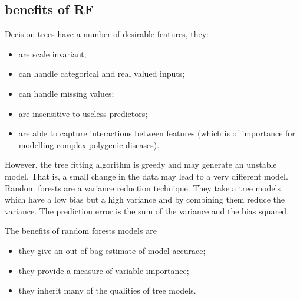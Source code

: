 \documentclass[10pt,letterpaper]{article}
\begin{document}
\subsection*{benefits of RF}  



Decision trees have a number of desirable features, they:
\begin{itemize}
  \item are scale invariant;
  \item can handle categorical and real valued inputs;
  \item can handle missing values;
  \item are insensitive to useless predictors;
  \item are able to capture interactions between features (which is of importance for modelling complex polygenic diseases).
  \end{itemize}
However, the tree fitting algorithm is greedy and may generate an unstable model. That is, a small change in the data may
lead to a very different model. 
Random forests are a variance reduction technique. They take a tree models which have a low bias but a high variance and
by combining them reduce the variance. The prediction error is the sum of the variance and the bias squared. 

The benefits of random forests models are
  \begin{itemize}
  \item they give an out-of-bag estimate of model accurace;
  \item they provide a measure of variable importance;
  \item they inherit many of the qualities of tree models.
  \end{itemize}
\end{document}
